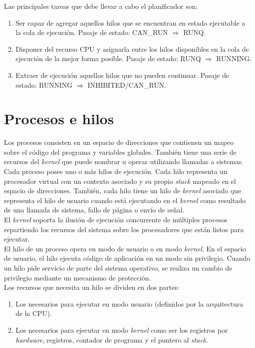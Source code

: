 \documentclass[a4paper]{book}
\begin{document}
Las principales tareas que debe llevar a cabo el planificador son:
\begin{enumerate}
\item Ser capaz de agregar aquellos hilos que se encuentran en estado ejecutable a la cola de ejecución. Pasaje de estado: CAN\_RUN $\Rightarrow$  RUNQ.
\item Disponer del recurso CPU y asignarla entre los hilos disponibles en la cola de ejecución de la mejor forma posible. Pasaje de estado: RUNQ $\Rightarrow$ RUNNING.
\item Extraer de ejecución aquellos hilos que no pueden continuar. Pasaje de estado: RUNNING $\Rightarrow$ INHIBITED/CAN\_RUN.
\end{enumerate}


\section{Procesos e hilos}

Los procesos consisten en un espacio de direcciones que contienen un mapeo sobre el código del programa y variables globales. También tiene una serie de recursos del \emph{kernel} que puede nombrar u operar utilizando llamadas a sistemas.\\

Cada proceso posee uno o más hilos de ejecución. Cada hilo representa un procesador virtual con un contexto asociado y su propio \emph{stack} mapeado en el espacio de direcciones. También, cada hilo tiene un hilo de \emph{kernel} asociado que representa el hilo de usuario cuando está ejecutando en el \emph{kernel} como resultado de una llamada de sistema, fallo de página o envío de señal.\\

El \emph{kernel} soporta la ilusión de ejecución concurrente de múltiples procesos repartiendo los recursos del sistema sobre los procesadores que están listos para ejecutar.\\

El hilo de un proceso opera en modo de usuario o en modo \emph{kernel}. En el espacio de usuario, el hilo ejecuta código de aplicación en un modo sin privilegio. Cuando un hilo pide servicio de parte del sistema operativo, se realiza un cambio de privilegio mediante un mecanismo de protección.\\

Los recursos que necesita un hilo se dividen en dos partes:
\begin{enumerate}
\item Los necesarios para ejecutar en modo usuario (definidos por la arquitectura de la CPU).
\item Los necesarios para ejecutar en modo \emph{kernel} como ser los registros por \emph{hardware}, registros, contador de programa y el puntero al \emph{stack}.
\end{enumerate}
\end{document}
